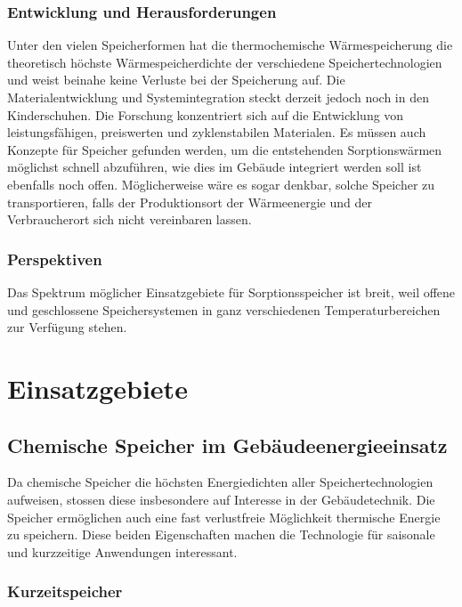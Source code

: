 \documentclass[11pt,a4paper]{scrartcl}
\begin{document}
\subsubsection{Entwicklung und Herausforderungen}
Unter den vielen Speicherformen hat die thermochemische Wärmespeicherung die
theoretisch höchste Wärmespeicherdichte der verschiedene Speichertechnologien
und weist beinahe keine Verluste bei der Speicherung auf. Die Materialentwicklung
und Systemintegration steckt derzeit jedoch noch in den Kinderschuhen.
Die Forschung konzentriert sich auf die Entwicklung von
leistungsfähigen, preiswerten und zyklenstabilen Materialen. Es müssen auch
Konzepte für Speicher gefunden werden, um die entstehenden Sorptionswärmen
möglichst schnell abzuführen, wie dies im Gebäude integriert werden soll ist
ebenfalls noch offen. Möglicherweise wäre es sogar denkbar, solche Speicher zu
transportieren, falls der Produktionsort der Wärmeenergie und der Verbraucherort
sich nicht vereinbaren lassen.

\subsubsection{Perspektiven}
Das Spektrum möglicher Einsatzgebiete für Sorptionsspeicher ist breit, weil
offene und geschlossene Speichersystemen in ganz verschiedenen
Temperaturbereichen zur Verfügung stehen.


\newpage
\section{Einsatzgebiete}
\subsection{Chemische Speicher im Gebäudeenergieeinsatz}
Da chemische Speicher die höchsten Energiedichten aller Speichertechnologien
aufweisen, stossen diese insbesondere auf Interesse in
der Gebäudetechnik. Die Speicher ermöglichen auch eine fast verlustfreie
Möglichkeit thermische Energie zu speichern. Diese beiden Eigenschaften machen
die Technologie für saisonale und kurzzeitige Anwendungen interessant.

\subsubsection{Kurzeitspeicher}
\end{document}
